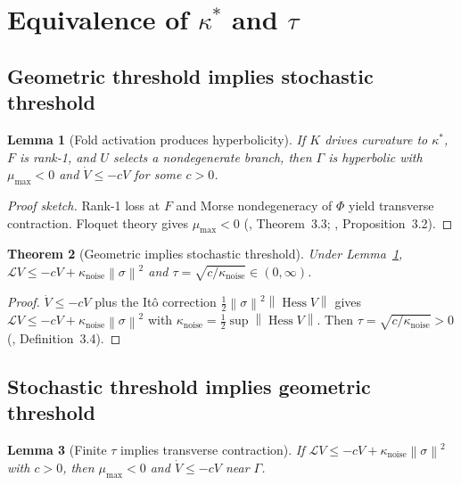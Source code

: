 \documentclass[12pt, oneside]{book}
\theoremstyle{plain}
\newtheorem{theorem}{Theorem}[section]
\newtheorem{lemma}[theorem]{Lemma}
\theoremstyle{definition}
\theoremstyle{remark}
\newcommand{\Orb}{\Gamma}
\newcommand{\cL}{\mathcal{L}}
\newcommand{\norm}[1]{\left\|#1\right\|}
\DeclareMathOperator{\Hess}{Hess}
\begin{document}
\section{Equivalence of \texorpdfstring{$\kappa^*$}{kappa*} and
  \texorpdfstring{$\tau$}{tau}}
\label{sec:threshold-equiv}

\subsection{Geometric threshold implies stochastic threshold}

\begin{lemma}[Fold activation produces hyperbolicity]
\label{lem:fold-hyp}
If $K$ drives curvature to $\kappa^*$, $F$ is rank-1, and $U$
selects a nondegenerate branch, then $\Orb$ is hyperbolic with
$\mu_{\max}<0$ and $\dot V\le -cV$ for some $c>0$.
\end{lemma}

\begin{proof}[Proof sketch]
Rank-1 loss at $F$ and Morse nondegeneracy of $\Phi$ yield
transverse contraction. Floquet theory gives $\mu_{\max}<0$
(\cite{PO1}, Theorem~3.3; \cite{Paper1}, Proposition~3.2).
\end{proof}

\begin{theorem}[Geometric implies stochastic threshold]
\label{thm:geom-stoch}
Under Lemma~\ref{lem:fold-hyp},
$\cL V\le -cV+\kappa_{\mathrm{noise}}\norm{\sigma}^2$
and $\tau=\sqrt{c/\kappa_{\mathrm{noise}}}\in(0,\infty)$.
\end{theorem}

\begin{proof}
$\dot V\le -cV$ plus the It\^{o} correction
$\frac{1}{2}\norm{\sigma}^2\norm{\Hess V}$ gives
$\cL V\le -cV+\kappa_{\mathrm{noise}}\norm{\sigma}^2$
with $\kappa_{\mathrm{noise}}=\frac{1}{2}\sup\norm{\Hess V}$.
Then $\tau=\sqrt{c/\kappa_{\mathrm{noise}}}>0$
(\cite{Paper1}, Definition~3.4).
\end{proof}

\subsection{Stochastic threshold implies geometric threshold}

\begin{lemma}[Finite $\tau$ implies transverse contraction]
\label{lem:tau-contract}
If $\cL V\le -cV+\kappa_{\mathrm{noise}}\norm{\sigma}^2$ with
$c>0$, then $\mu_{\max}<0$ and $\dot V\le -cV$ near $\Orb$.
\end{lemma}
\end{document}
